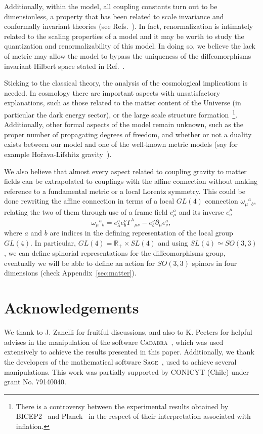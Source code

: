 \documentclass{ws-mpla}
\renewcommand{\(}{\left(}
\renewcommand{\)}{\right)}
\renewcommand{\[}{\left[}
\renewcommand{\]}{\right]}
\begin{document}
Additionally, within the model, all coupling constants turn out to be dimensionless, a property that has been related to scale invariance and conformally invariant theories (see Refs.~\cite{Buchholz:1976hz,Maldacena:2011mk}). In fact, renormalization is intimately related to the scaling properties of a model and it may be worth to study the quantization and renormalizability of this  model. In doing so, we believe the lack of metric may allow the model to bypass the uniqueness of the diffeomorphisms invariant Hilbert space stated in Ref.~\cite{Lewandowski:2005jk}.

Sticking to the classical theory, the analysis of the cosmological implications is needed. In cosmology there are important aspects with unsatisfactory explanations, such as those related to the matter content of the Universe (in particular the dark energy sector), or the large scale structure formation~\footnote{There is a controversy between the experimental results obtained by BICEP2~\cite{Ade:2014xna} and Planck~\cite{Adam:2014bub} in the respect of their interpretation associated with inflation.}. Additionally, other formal aspects of the model remain unknown, such as the proper number of propagating degrees of freedom, and whether or not a duality exists between our model and one of the well-known metric models (say for example Ho\v{r}ava-Lifshitz gravity~\cite{Horava:2009uw,Sotiriou:2010wn}).

We also believe that almost every aspect related to coupling gravity to matter fields can be extrapolated to couplings with the affine connection without making reference to a fundamental metric or a local Lorentz symmetry. This could be  done rewriting the affine connection in terms of a local $GL(4)$ connection
$\omega_{\mu}{}^a{}_b$, relating the two of them through use of a frame field $e_\mu^a$ and its inverse $e^\mu_a$
\begin{equation}
  \omega_{\mu}{}^a{}_b = e_\lambda^a e_b^\nu \Gamma^{\lambda}{}_{\mu\nu} -  e_b^\nu\partial_{\mu}e_\nu^a,
\end{equation} where $a$ and $b$ are indices in the defining representation of the local group $GL(4)$.
 In particular, \mbox{$GL(4) = \mathbb{R}_+ \times SL(4)$} and using \mbox{$SL(4) \simeq SO(3,3)$,} we can define spinorial representations for the diffeomorphisms group, eventually we will be able to define an action for $SO(3,3)$ spinors in four dimensions (check Appendix~\ref{sec:matter}).


\section*{Acknowledgements}
  We thank to J. Zanelli for fruitful discussions, and also to K. Peeters for helpful advises in the manipulation of the software \textsc{Cadabra}~\cite{Peeters:2007wn,peeters2007symbolic,Peeters2007550}, which was used extensively to achieve the results presented in this paper. Additionally, we thank the developers of the mathematical software \textsc{Sage}~\cite{sage}, used to achieve several manipulations. This work was partially supported by CONICYT (Chile) under grant No. 79140040.
\end{document}

